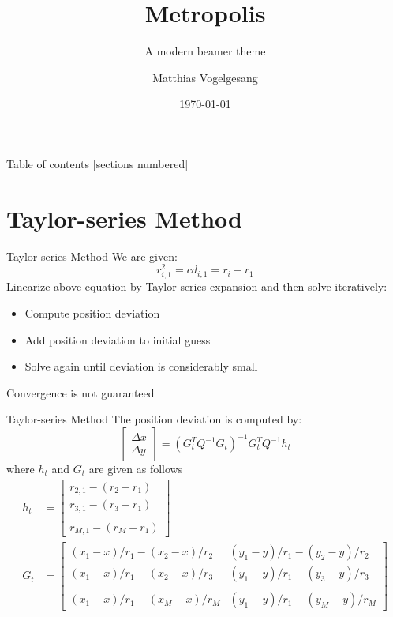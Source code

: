 \documentclass[10pt]{beamer}
\title{Metropolis}
\subtitle{A modern beamer theme}
\date{\today}
\author{Matthias Vogelgesang}
\institute{Center for modern beamer themes}
\begin{document}
\maketitle

\begin{frame}{Table of contents}
  [sections numbered]
  \tableofcontents[hideallsubsections]
\end{frame}
\section{Taylor-series Method}

\begin{frame}{Taylor-series Method}
	We are given:
  $$ r_{i,1}^2=cd_{i,1}=r_{i}-r_{1} $$
  Linearize above equation by Taylor-series expansion and then solve iteratively:
	\begin{itemize}
    \item Compute position deviation
    \item Add position deviation to initial guess
    \item Solve again until deviation is considerably small
  \end{itemize}
  \alert{Convergence is not guaranteed}
\end{frame}


\begin{frame}{Taylor-series Method}
	The position deviation is computed by:
   $$\begin{bmatrix} \Delta x \\ \Delta y \end{bmatrix} = (G_{t}^T Q^{-1} G_{t})^{-1} G_{t}^T Q^{-1} h_{t}$$
  where $h_{t}$ and $G_{t}$ are given as follows
 \begin{align}
    h_{t} &= \begin{bmatrix} r_{2,1} - (r_{2}-r_{1}) \\  r_{3,1} - (r_{3}-r_{1})\\  \quad\\  r_{M,1} - (r_{M}-r_{1}) \end{bmatrix}  \\
    G_{t} &= \begin{bmatrix} (x_{1}-x)/r_{1} - (x_{2}-x)/r_{2} & (y_{1}-y)/r_{1} - (y_{2}-y)/r_{2} \\ (x_{1}-x)/r_{1} - (x_{2}-x)/r_{3} & (y_{1}-y)/r_{1} - (y_{3}-y)/r_{3}\\  \quad\\ (x_{1}-x)/r_{1} - (x_{M}-x)/r_{M} & (y_{1}-y)/r_{1} - (y_{M}-y)/r_{M} \end{bmatrix}
  \end{align}

\end{frame}
\end{document}
